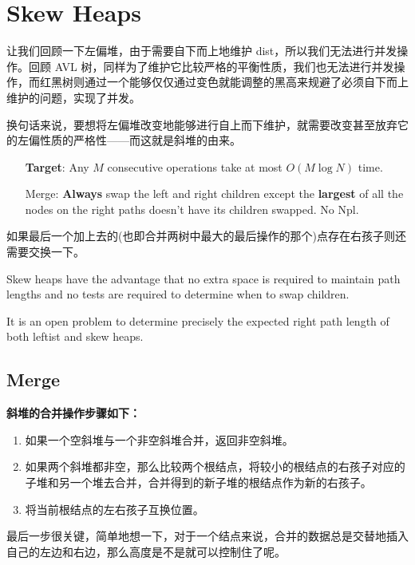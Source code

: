 \documentclass{article}
\begin{document}
\section{Skew Heaps}
\hypertarget{Skew}{}
让我们回顾一下左偏堆，由于需要自下而上地维护 dist，所以我们无法进行并发操作。回顾 AVL 树，同样为了维护它比较严格的平衡性质，我们也无法进行并发操作，而红黑树则通过一个能够仅仅通过变色就能调整的黑高来规避了必须自下而上维护的问题，实现了并发。\par
换句话来说，要想将左偏堆改变地能够进行自上而下维护，就需要改变甚至放弃它的左偏性质的严格性——而这就是斜堆的由来。\par
\begin{itemize}
    \item [\textbf{Target}:] Any $M$ consecutive operations take at most $O(M\log N)$ time. 
    \item [Merge:] \textbf{Always} swap the left and right children  except the \textbf{largest} of all the nodes on the right paths doesn't have its children swapped. No Npl. 
\end{itemize}
\par
如果最后一个加上去的(也即合并两树中最大的最后操作的那个)点存在右孩子则还需要交换一下。\par

Skew heaps have the advantage that no extra space is required to maintain path lengths and no tests are required to determine when to swap children.\par

It is an open problem to determine precisely the expected right path length of both leftist and skew heaps.\par

\subsection{Merge}
\textbf{斜堆的合并操作步骤如下：}\par
\begin{enumerate}
    \item 如果一个空斜堆与一个非空斜堆合并，返回非空斜堆。
    \item 如果两个斜堆都非空，那么比较两个根结点，将较小的根结点的右孩子对应的子堆和另一个堆去合并，合并得到的新子堆的根结点作为新的右孩子。
    \item 将当前根结点的左右孩子互换位置。
\end{enumerate}
最后一步很关键，简单地想一下，对于一个结点来说，合并的数据总是交替地插入自己的左边和右边，那么高度是不是就可以控制住了呢。
\end{document}

